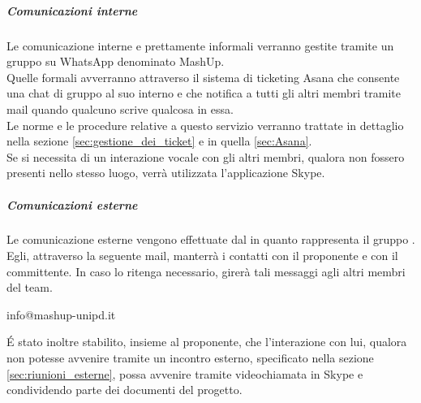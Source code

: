 				\subparagraph{Comunicazioni interne} \label{sec:comunicazioni_interne}
				Le comunicazione interne e prettamente informali verranno gestite tramite un gruppo su WhatsApp denominato MashUp. \\
				Quelle formali avverranno attraverso il sistema di ticketing Asana che consente una chat di gruppo al suo interno e che notifica a tutti gli altri membri tramite mail quando qualcuno scrive qualcosa in essa. \\
				Le norme e le procedure relative a questo servizio verranno trattate in dettaglio nella sezione \ref{sec:gestione_dei_ticket} e in quella \ref{sec:Asana}. \\
				Se si necessita di un interazione vocale con gli altri membri, qualora non fossero presenti nello stesso luogo, verrà utilizzata l'applicazione Skype.
				\subparagraph{Comunicazioni esterne} \label{sec:comunicazioni_esterne}
				Le comunicazione esterne vengono effettuate dal \roleProjectManager{} in quanto rappresenta il gruppo \groupName. \\
				Egli, attraverso la seguente mail, manterrà i contatti con il proponente e con il committente. In caso lo ritenga necessario, girerà tali messaggi agli altri membri del team.
					\begin{center}
						info@mashup-unipd.it
					\end{center}
					\'E stato inoltre stabilito, insieme al proponente, che l'interazione con lui, qualora non potesse avvenire tramite un incontro esterno, specificato nella sezione \ref{sec:riunioni_esterne}, possa avvenire tramite videochiamata in Skype	e condividendo parte dei documenti del progetto.	
